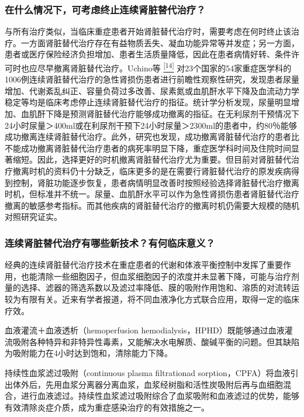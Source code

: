 \subsubsection{在什么情况下，可考虑终止连续肾脏替代治疗？}

与所有治疗类似，当临床重症患者开始肾脏替代治疗时，需要考虑在何时终止该治疗。一方面肾脏替代治疗存在有益物质丢失、凝血功能异常等并发症；另一方面，患者或医疗保险经济负担增加、患者生活质量降低，因此在患者病情好转、条件许可时也应尽早撤离肾脏替代治疗。Uchino等
\protect\hyperlink{text00018.htmlux5cux23ch14-17}{\textsuperscript{{[}14{]}}}
对23个国家的54家重症医学科的1006例连续肾脏替代治疗的急性肾损伤患者进行前瞻性观察性研究，发现患者尿量增加、代谢紊乱纠正、容量负荷过多改善、尿素氮或血肌酐水平下降及血流动力学稳定等均是临床考虑停止连续肾脏替代治疗的指征。统计学分析发现，尿量明显增加、血肌酐下降是预测肾脏替代治疗能够成功撤离的指征。在无利尿剂干预情况下24小时尿量＞400ml或在利尿剂干预下24小时尿量＞2300ml的患者中，约80％能够成功撤离连续肾脏替代治疗。此外，研究也发现，成功撤离肾脏替代治疗的患者比不能成功撤离肾脏替代治疗患者的病死率明显下降，重症医学科时间及住院时间显著缩短。因此，选择更好的时机撤离肾脏替代治疗尤为重要。但目前对肾脏替代治疗撤离时机的资料仍十分缺乏，临床更多的是在需要行肾脏替代治疗的原发疾病得到控制，肾脏功能逐步恢复，患者病情明显改善时按照经验选择肾脏替代治疗撤离时机，但标准并不统一。尿量、血肌酐水平可以作为急性肾损伤患者肾脏替代治疗撤离的敏感参考指标。而其他疾病的肾脏替代治疗的撤离时机仍需要大规模的随机对照研究证实。

\subsubsection{连续肾脏替代治疗有哪些新技术？有何临床意义？}

经典的连续肾脏替代治疗技术在重症患者的代谢和体液平衡控制中发挥了重要作用，也能清除一些细胞因子，但血浆细胞因子的浓度并未显著下降，可能与治疗剂量的选择、滤器的筛选系数以及滤过率降低、膜的吸附作用饱和、溶质的对流转运较为有限有关。近来有学者报道，将不同血液净化方式联合应用，取得一定的临床疗效。

血液灌流＋血液透析（hemoperfusion
hemodialysis，HPHD）既能够通过血液灌流吸附各种特异和非特异性毒素，又能解决水电解质、酸碱平衡的问题。但其缺陷为吸附能力在4小时达到饱和，清除能力下降。

持续性血浆滤过吸附（continuous plasma filtrationad
sorption，CPFA）将血液引出体外后，先用血浆分离器分离血浆，血浆经树脂和活性炭吸附后再与血细胞混合，进行血液滤过。持续性血浆滤过吸附综合了血浆吸附和血液滤过的优势，能够有效清除炎症介质，成为重症感染治疗的有效措施之一。

